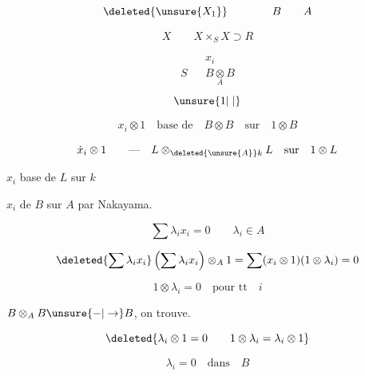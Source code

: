 \[
\deleted{\unsure{X_1}} \qquad\qquad B\qquad A
\]

\[
X\qquad X\times_S X\supset R
\]


\[
\begin{aligned}
&&x_i\\
S&& B\underset{A}{\otimes}B
\end{aligned}
\]
\[
\unsure{1|\mid}
\]


\[
x_i\otimes 1\quad\text{base de}\quad B\otimes B\quad\text{sur}\quad 1\otimes B
\]

\[
\dot x_i\otimes 1\qquad\mathord{\text{---}}\quad L\otimes_{\deleted{\unsure{A}}k}L\quad\text{sur}\quad1\otimes L
\]

$x_i$ base de $L$ sur $k$

$x_i$  de $B$ sur $A$ par Nakayama.

\[
\sum\lambda_i x_i=0\qquad\lambda_i\in A
\]

\[
\deleted{\sum\lambda_i x_i}\left(\sum\lambda_i x_i\right)\otimes_A1
=\sum(x_i\otimes1)(1\otimes\lambda_i)=0
\]

\[
1\otimes\lambda_i=0\quad\text{pour }\text{tt}\quad i
\]

 $B\otimes_A B\unsure{\mathbin{-}|\to}B$, on trouve.

\[
\deleted{\lambda_i\otimes1=0\qquad1\otimes\lambda_i=\lambda_i\otimes1}
\]

\[
\lambda_i=0\quad\text{dans}\quad B
\]
